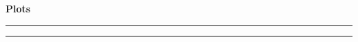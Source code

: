 \documentclass[11pt, oneside]{article}
\begin{document}
\begin{center}
    \vspace*{5cm}
    \LARGE\textbf{Plots}\normalsize
\end{center}

\hrule
\vspace*{0.05cm}
\hrule

\newpage

\end{document}
